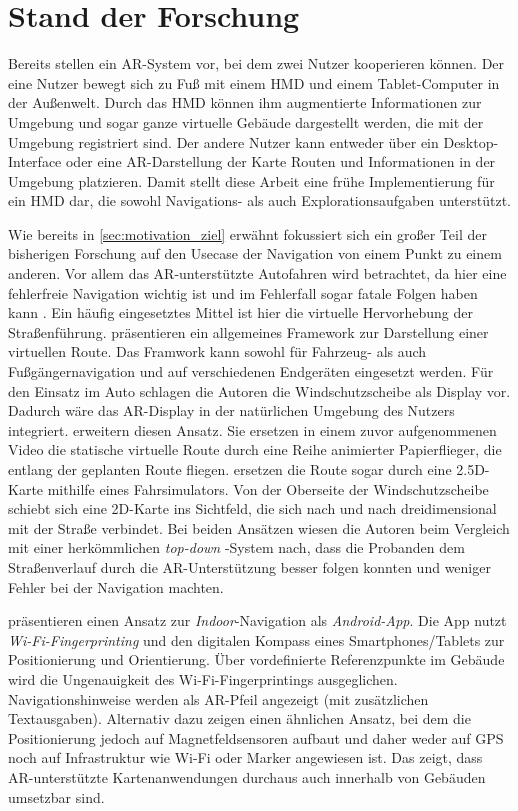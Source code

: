 \chapter{Stand der Forschung}
\label{chap:related_work}
Bereits \textcite{Hoellerer1999} stellen ein \gls{AR}-System vor, bei dem zwei Nutzer kooperieren können.
Der eine Nutzer bewegt sich zu Fuß mit einem \gls{HMD} und einem Tablet-Computer in der Außenwelt.
Durch das \gls{HMD} können ihm augmentierte Informationen zur Umgebung und sogar ganze virtuelle Gebäude dargestellt werden, die mit der Umgebung registriert sind.
Der andere Nutzer kann entweder über ein Desktop-Interface oder eine \gls{AR}-Darstellung der Karte Routen und Informationen in der Umgebung platzieren.
Damit stellt diese Arbeit eine frühe Implementierung für ein \gls{HMD} dar, die sowohl Navigations- als auch Explorationsaufgaben unterstützt.

Wie bereits in \autoref{sec:motivation_ziel} erwähnt fokussiert sich ein großer Teil der bisherigen Forschung auf den Usecase der Navigation von einem Punkt zu einem anderen.
Vor allem das \gls{AR}-unterstützte Autofahren wird betrachtet, da hier eine fehlerfreie Navigation wichtig ist und im Fehlerfall sogar fatale Folgen haben kann \parencite{Lin2017}.
Ein häufig eingesetztes Mittel ist hier die virtuelle Hervorhebung der Straßenführung.
\textcite{Narzt2006} präsentieren ein allgemeines Framework zur Darstellung einer virtuellen Route.
Das Framwork kann sowohl für Fahrzeug- als auch Fußgängernavigation und auf verschiedenen Endgeräten eingesetzt werden.
Für den Einsatz im Auto schlagen die Autoren die Windschutzscheibe als Display vor.
Dadurch wäre das AR-Display in der natürlichen Umgebung des Nutzers integriert.
\textcite{Bark2014} erweitern diesen Ansatz.
Sie ersetzen in einem zuvor aufgenommenen Video die statische virtuelle Route durch eine Reihe animierter Papierflieger, die entlang der geplanten Route fliegen.
\textcite{Kim2009} ersetzen die Route sogar durch eine 2.5D-Karte mithilfe eines Fahrsimulators.
Von der Oberseite der Windschutzscheibe schiebt sich eine 2D-Karte ins Sichtfeld, die sich nach und nach dreidimensional mit der Straße verbindet.
Bei beiden Ansätzen wiesen die Autoren beim Vergleich mit einer herkömmlichen \emph{top-down }-System nach, dass die Probanden dem Straßenverlauf durch die \gls{AR}-Unterstützung besser folgen konnten und weniger Fehler bei der Navigation machten.

\textcite{Alnabhan2014} präsentieren einen Ansatz zur \emph{Indoor}-Navigation als \emph{Android-App}.
Die App nutzt \emph{Wi-Fi-Fingerprinting} und den digitalen Kompass eines Smartphones/Tablets zur Positionierung und Orientierung.
Über vordefinierte Referenzpunkte im Gebäude wird die Ungenauigkeit des Wi-Fi-Fingerprintings ausgeglichen.
Navigationshinweise werden als \gls{AR}-Pfeil angezeigt (mit zusätzlichen Textausgaben).
Alternativ dazu zeigen \textcite{Liu2016} einen ähnlichen Ansatz, bei dem die Positionierung jedoch auf Magnetfeldsensoren aufbaut und daher weder auf \gls{GPS} noch auf Infrastruktur wie Wi-Fi oder Marker angewiesen ist.
Das zeigt, dass \gls{AR}-unterstützte Kartenanwendungen durchaus auch innerhalb von Gebäuden umsetzbar sind.

